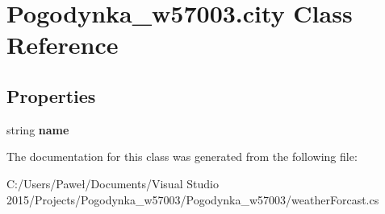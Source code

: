 \hypertarget{class_pogodynka__w57003_1_1city}{}\section{Pogodynka\+\_\+w57003.\+city Class Reference}
\label{class_pogodynka__w57003_1_1city}
\subsection*{Properties}
\begin{DoxyCompactItemize}
\item 
\mbox{\label{class_pogodynka__w57003_1_1city_a160a2b22892d59b257efb2b7eb135f9b}} 
string {\bfseries name}
\end{DoxyCompactItemize}


The documentation for this class was generated from the following file\+:\begin{DoxyCompactItemize}
\item 
C\+:/\+Users/\+Paweł/\+Documents/\+Visual Studio 2015/\+Projects/\+Pogodynka\+\_\+w57003/\+Pogodynka\+\_\+w57003/weather\+Forcast.\+cs\end{DoxyCompactItemize}
